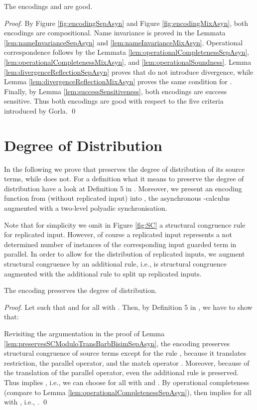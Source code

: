 \documentclass[]{llncs}
\begin{document}
\begin{theorem}
	The encodings  and  are good.
\end{theorem}

\begin{proof}
	By Figure \ref{fig:encodingSepAsyn} and Figure \ref{fig:encodingMixAsyn}, both encodings are compositional. Name invariance is proved in the Lemmata \ref{lem:nameInvarianceSepAsyn} and \ref{lem:nameInvarianceMixAsyn}. Operational correspondence follows by the Lemmata \ref{lem:operationalCompletenessSepAsyn}, \ref{lem:operationalCompletenessMixAsyn}, and \ref{lem:operationalSoundness}. Lemma \ref{lem:divergenceReflectionSepAsyn} proves that  do not introduce divergence, while Lemma \ref{lem:divergenceReflectionMixAsyn} proves the same condition for . Finally, by Lemma \ref{lem:successSensitiveness}, both encodings are success sensitive. Thus both encodings are good with respect to the five criteria introduced by Gorla.
	\qed
\end{proof}

\section{Degree of Distribution} \label{sec:proofsDistributability}

In the following we prove that  preserves the degree of distribution of its source terms, while  does not. For a definition what it means to preserve the degree of distribution have a look at Definition 5 in \cite{petersNestmann12}. Moreover, we present an encoding function from \piMix (without replicated input) into \piAsynTwo, the asynchronous \piCal-calculus augmented with a two-level polyadic synchronisation.

Note that for simplicity we omit in Figure \ref{fig:SC} a structural congruence rule for replicated input. However, of course a replicated input represents a not determined number of instances of the corresponding input guarded term in parallel. In order to allow for the distribution of replicated inputs, we augment structural congruence by an additional rule, i.e.,  is structural congruence  augmented with the additional rule  to split up replicated inputs.

\begin{lemma}
	The encoding  preserves the degree of distribution.
\end{lemma}

\begin{proof}
	Let  such that  and  for all  with . Then, by Definition 5 in \cite{petersNestmann12}, we have to show that:
	
	Revisiting the argumentation in the proof of Lemma \ref{lem:preservesSCModuloTransBarbBisimSepAsyn}, the encoding  preserves structural congruence of source terms except for the rule , because it translates restriction, the parallel operator, and the match operator \cleanly. Moreover, because of the \clean translation of the parallel operator, even the additional rule  is preserved. Thus  implies , i.e., we can choose  for all  with  and . By operational completeness (compare to Lemma \ref{lem:operationalCompletenessSepAsyn}), then  implies  for all  with , i.e., .
	\qed
\end{proof}
\end{document}
